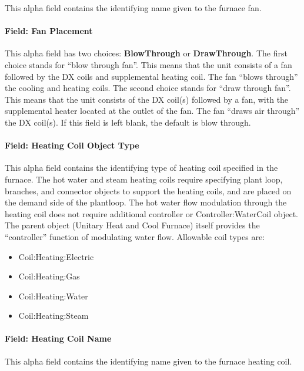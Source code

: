 This alpha field contains the identifying name given to the furnace fan.

\paragraph{Field: Fan Placement}\label{field-fan-placement-1}

This alpha field has two choices: \textbf{BlowThrough} or \textbf{DrawThrough}. The first choice stands for ``blow through fan''. This means that the unit consists of a fan followed by the DX coils and supplemental heating coil. The fan ``blows through'' the cooling and heating coils. The second choice stands for ``draw through fan''. This means that the unit consists of the DX coil(s) followed by a fan, with the supplemental heater located at the outlet of the fan. The fan ``draws air through'' the DX coil(s). If this field is left blank, the default is blow through.

\paragraph{Field: Heating Coil Object Type}\label{field-heating-coil-object-type-1-000}

This alpha field contains the identifying type of heating coil specified in the furnace. The hot water and steam heating coils require specifying plant loop, branches, and connector objects to support the heating coils, and are placed on the demand side of the plantloop. The hot water flow modulation through the heating coil does not require additional controller or Controller:WaterCoil object. The parent object (Unitary Heat and Cool Furnace) itself provides the ``controller'' function of modulating water flow. Allowable coil types are:

\begin{itemize}
\item
  Coil:Heating:Electric
\item
  Coil:Heating:Gas
\item
  Coil:Heating:Water
\item
  Coil:Heating:Steam
\end{itemize}

\paragraph{Field: Heating Coil Name}\label{field-heating-coil-name-1-000}

This alpha field contains the identifying name given to the furnace heating coil.


